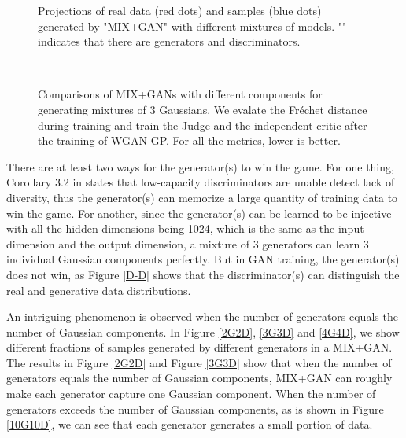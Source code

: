 \documentclass[conference]{IEEEtran}
\begin{document}
\begin{figure}[!h]
	\begin{center}
	\end{center}
	\caption{Projections of real data (red dots) and samples (blue dots) generated by "MIX+GAN" with different mixtures of models. "" indicates that there are  generators and  discriminators.}
	\label{comp_quali}
\end{figure}


\begin{figure}[!h]
	\begin{center}
		\\
	\end{center}
	\caption{Comparisons of MIX+GANs with different components for generating mixtures of 3 Gaussians. We evalate the Fréchet distance during training and train the Judge and the independent critic after the training of WGAN-GP. For all the metrics, lower is better.}
	\label{comp_quant}
\end{figure}

There are at least two ways for the generator(s) to win the game. For one thing, Corollary 3.2 in \cite{generalization} states that low-capacity discriminators are unable detect lack of diversity, thus the generator(s) can memorize a large quantity of training data to win the game. For another, since the generator(s) can be learned to be injective with all the hidden dimensions being 1024, which is the same as the input dimension and the output dimension, a mixture of 3 generators can learn 3 individual Gaussian components perfectly. But in GAN training, the generator(s) does not win, as Figure \ref{D-D} shows that the discriminator(s) can distinguish the real and generative data distributions.

An intriguing phenomenon is observed when the number of generators equals the number of Gaussian components.
In Figure \ref{2G2D}, \ref{3G3D} and \ref{4G4D}, we show different fractions of samples generated by different generators in a MIX+GAN. The results in Figure \ref{2G2D} and Figure \ref{3G3D} show that when the number of generators equals the number of Gaussian components, MIX+GAN can roughly make each generator capture one Gaussian component.
When the number of generators exceeds the number of Gaussian components, as is shown in Figure \ref{10G10D}, we can see that each generator generates a small portion of data.
\end{document}
